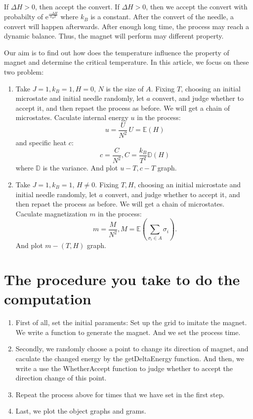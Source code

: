 \documentclass[11pt,openany]{book}              %
\begin{document}
If \(\Delta H>0\), then accept the convert. If \(\Delta H > 0 \), then we accept the convert with
probabilty of \(\mathrm{e}^{\frac{- \Delta H}{k_BT}}\) where \(k_{B}\) is a constant.
After the convert of the needle, a convert will happen afterwards. After enough long time,
the process may reach a dynamic balance. Thus, the magnet will perform may different property.

Our aim is to find out how does the temperature influence the property of magnet and determine 
the critical temperature. In this article, we focus on these two problem:
\begin{enumerate}
  
  \item Take \(J=1, k_B=1, H=0\), \(N\) is the size of \(A\). Fixing \(T\), 
    choosing an initial microstate and initial needle randomly, 
    let \(a\) convert, and judge whether to accept it, and then repaet the process as before.
    We will get a chain of microstates.
    Caculate internal energy \(u\) in the process:
    \begin{equation}
    \, u=\frac{U}{N^2}    \, U=\mathbb{E}(H)
    \end{equation}
    and specific heat \(c\):
    \begin{equation}
    \, c=\frac{C}{N^2}, C=\frac{k_B}{T^2} \mathbb{D}(H)
    \end{equation}
    where \(\mathbb{D}\) is the variance.
    And plot \(u-T, c-T\) graph.
  \item Take \(J=1, k_B=1\), \(H \neq 0\). Fixing \(T, H\), 
    choosing an initial microstate and initial needle randomly, 
    let \(a\) convert, and judge whether to accept it, and then repaet the process as before.
    We will get a chain of microstates.
    Caculate magnetization \(m\) in the process:
    \begin{equation}
    \, m=\frac{M}{N^2}, M=\mathbb{E}(\sum_{\sigma_i \in A} \sigma_i ).
    \end{equation}
    And plot \(m-(T, H)\) graph.
\end{enumerate}



\section{The procedure you take to do the computation }
\begin{enumerate}
  \item First of all, set the initial paraments: Set up 
    the grid to imitate the magnet. We write a function 
    to generate the magnet. And we set the process time.
  \item Secondly, we randomly choose a point to change 
    its direction of magnet, and caculate the changed energy
    by the getDeltaEnergy function. And then, we write a 
    use the WhetherAccept function to judge whether to accept 
    the direction change of this point.
  \item Repeat the process above for times that we have set
    in the first step.
  \item Last, we plot the object graphs and grams.
\end{enumerate}
\end{document}
